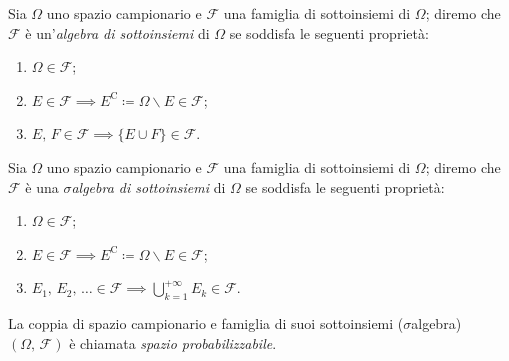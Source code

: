         \begin{defn}
            Sia $\Omega$ uno spazio campionario e $\mathscr{F}$ una famiglia di sottoinsiemi di $\Omega$; diremo che $\mathscr{F}$ è un'\emph{algebra di sottoinsiemi} di $\Omega$ se soddisfa le seguenti proprietà:
            \begin{enumerate}
                \item $\Omega \in \mathscr{F}$;
                \item $E \in \mathscr{F} \implies E^{\text{C}} \coloneqq \Omega \backslash E \in \mathscr{F}$;
                \item $E,\,F \in \mathscr{F} \implies \{E \cup F\} \in \mathscr{F}$.
            \end{enumerate}
        \end{defn}
        \begin{defn}
            Sia $\Omega$ uno spazio campionario e $\mathscr{F}$ una famiglia di sottoinsiemi di $\Omega$; diremo che $\mathscr{F}$ è una \emph{$\sigma$\nbdash algebra di sottoinsiemi} di $\Omega$ se soddisfa le seguenti proprietà:
            \begin{enumerate}
                \item $\Omega \in \mathscr{F}$;
                \item $E \in \mathscr{F} \implies E^{\text{C}} \coloneqq \Omega \backslash E \in \mathscr{F}$;
                \item $E_1,\,E_2,\,\ldots \in \mathscr{F} \implies \bigcup_{k=1}^{+\infty}E_k \in \mathscr{F}$.
            \end{enumerate}
        \end{defn}
        \begin{defn}
            La coppia di spazio campionario e famiglia di suoi sottoinsiemi ($\sigma$\nbdash algebra) $(\Omega,\,\mathscr{F})$ è chiamata \emph{spazio probabilizzabile}.
        \end{defn}

